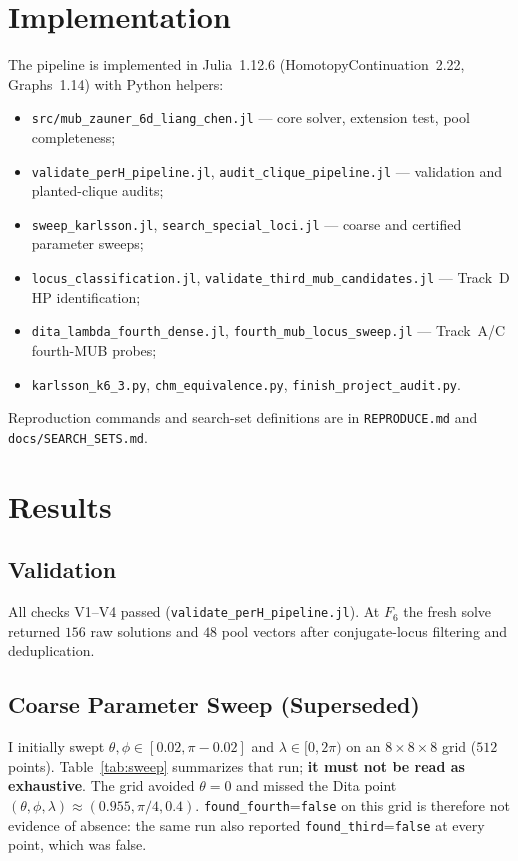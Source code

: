 \documentclass[onecolumn]{IEEEtran}
\begin{document}
\section{Implementation}
\label{sec:impl}

The pipeline is implemented in Julia~1.12.6 (HomotopyContinuation~2.22, Graphs~1.14) with Python helpers:
\begin{itemize}
    \item \texttt{src/mub\_zauner\_6d\_liang\_chen.jl} --- core solver, extension test, pool completeness;
    \item \texttt{validate\_perH\_pipeline.jl}, \texttt{audit\_clique\_pipeline.jl} --- validation and planted-clique audits;
    \item \texttt{sweep\_karlsson.jl}, \texttt{search\_special\_loci.jl} --- coarse and certified parameter sweeps;
    \item \texttt{locus\_classification.jl}, \texttt{validate\_third\_mub\_candidates.jl} --- Track~D HP identification;
    \item \texttt{dita\_lambda\_fourth\_dense.jl}, \texttt{fourth\_mub\_locus\_sweep.jl} --- Track~A/C fourth-MUB probes;
    \item \texttt{karlsson\_k6\_3.py}, \texttt{chm\_equivalence.py}, \texttt{finish\_project\_audit.py}.
\end{itemize}
Reproduction commands and search-set definitions are in \texttt{REPRODUCE.md} and \texttt{docs/SEARCH\_SETS.md}.

\section{Results}
\label{sec:results}

\subsection{Validation}
All checks V1--V4 passed (\texttt{validate\_perH\_pipeline.jl}).
At $F_6$ the fresh solve returned $156$ raw solutions and $48$ pool vectors after conjugate-locus filtering and deduplication.

\subsection{Coarse Parameter Sweep (Superseded)}
\label{sec:coarsesweep}
I initially swept $\theta,\phi\in[0.02,\pi-0.02]$ and $\lambda\in[0,2\pi)$ on an $8\times8\times8$ grid ($512$ points).
Table~\ref{tab:sweep} summarizes that run; \textbf{it must not be read as exhaustive}.
The grid avoided $\theta=0$ and missed the Dita point $(\theta,\phi,\lambda)\approx(0.955,\pi/4,0.4)$.
\texttt{found\_fourth}=\texttt{false} on this grid is therefore not evidence of absence: the same run also reported \texttt{found\_third}=\texttt{false} at every point, which was false.
\end{document}
